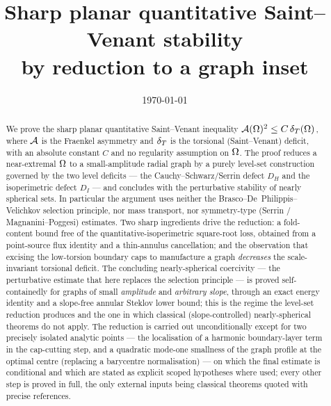 \documentclass[11pt,reqno]{amsart}
\title[Sharp planar Saint--Venant stability without selection]
{Sharp planar quantitative Saint--Venant stability\\
by reduction to a graph inset}
\author{}
\date{\today}
\begin{document}
\begin{abstract}
We prove the sharp planar quantitative Saint--Venant inequality
$\mathcal{A}(\Omega)^2\le C\,\delta_T(\Omega)$, where $\mathcal{A}$ is the Fraenkel asymmetry and
$\delta_T$ is the torsional (Saint--Venant) deficit, with an absolute constant
$C$ and no regularity assumption on $\Omega$. The proof reduces a
near-extremal $\Omega$ to a small-amplitude radial graph by a purely
level-set construction governed by the two level deficits --- the
Cauchy--Schwarz/Serrin defect $D_H$ and the isoperimetric defect $D_I$ ---
and concludes with the perturbative stability of nearly spherical sets. In
particular the argument uses neither the Brasco--De~Philippis--Velichkov
selection principle, nor mass transport, nor symmetry-type (Serrin /
Magnanini--Poggesi) estimates. Two sharp ingredients drive the reduction:
a fold-content bound free of the quantitative-isoperimetric square-root
loss, obtained from a point-source flux identity and a thin-annulus
cancellation; and the observation that excising the low-torsion boundary
caps to manufacture a graph \emph{decreases} the scale-invariant torsional
deficit. The concluding nearly-spherical coercivity --- the perturbative
estimate that here replaces the selection principle --- is proved
self-containedly for graphs of small \emph{amplitude} and \emph{arbitrary
slope}, through an exact energy identity and a slope-free annular Steklov
lower bound; this is the regime the level-set reduction produces and the one
in which classical (slope-controlled) nearly-spherical theorems do not
apply. The reduction is carried out unconditionally except for two precisely
isolated analytic points --- the localisation of a harmonic boundary-layer
term in the cap-cutting step, and a quadratic mode-one smallness of the graph
profile at the optimal centre (replacing a barycentre normalisation) --- on
which the final estimate is conditional and which are stated as explicit
scoped hypotheses where used; every other step is proved in full, the only
external inputs being classical theorems quoted with precise references.
\end{abstract}

\maketitle

\tableofcontents













\end{document}
